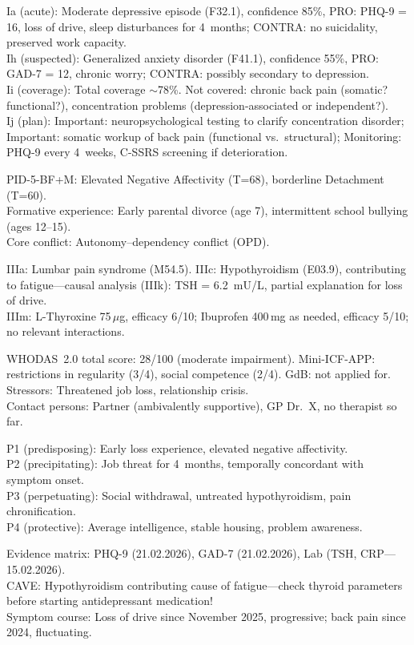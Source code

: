 \documentclass[11pt,a4paper]{article}
\begin{document}
\begin{description}[style=nextline, leftmargin=1.5cm, font=\bfseries\small]
\item[Axis~I (Mental Health Profiles)]
Ia (acute): Moderate depressive episode (F32.1), confidence 85\%, PRO: PHQ-9 = 16, loss of drive, sleep disturbances for 4~months; CONTRA: no suicidality, preserved work capacity. \\
Ih (suspected): Generalized anxiety disorder (F41.1), confidence 55\%, PRO: GAD-7 = 12, chronic worry; CONTRA: possibly secondary to depression. \\
Ii (coverage): Total coverage $\sim$78\%. Not covered: chronic back pain (somatic? functional?), concentration problems (depression-associated or independent?). \\
Ij (plan): Important: neuropsychological testing to clarify concentration disorder; Important: somatic workup of back pain (functional vs.\ structural); Monitoring: PHQ-9 every 4~weeks, C-SSRS screening if deterioration.
\item[Axis~II (Biography)]
PID-5-BF+M: Elevated Negative Affectivity (T=68), borderline Detachment (T=60). \\
Formative experience: Early parental divorce (age 7), intermittent school bullying (ages 12--15). \\
Core conflict: Autonomy--dependency conflict (OPD).
\item[Axis~III (Medical Synopsis)]
IIIa: Lumbar pain syndrome (M54.5). IIIc: Hypothyroidism (E03.9), contributing to fatigue---causal analysis (IIIk): TSH = 6.2~mU/L, partial explanation for loss of drive. \\
IIIm: L-Thyroxine 75\,$\mu$g, efficacy 6/10; Ibuprofen 400\,mg as needed, efficacy 5/10; no relevant interactions.
\item[Axis~IV (Environment \& Functioning)]
WHODAS~2.0 total score: 28/100 (moderate impairment). Mini-ICF-APP: restrictions in regularity (3/4), social competence (2/4). GdB: not applied for. \\
Stressors: Threatened job loss, relationship crisis. \\
Contact persons: Partner (ambivalently supportive), GP Dr.~X, no therapist so far.
\item[Axis~V (Condition Model)]
P1 (predisposing): Early loss experience, elevated negative affectivity. \\
P2 (precipitating): Job threat for 4~months, temporally concordant with symptom onset. \\
P3 (perpetuating): Social withdrawal, untreated hypothyroidism, pain chronification. \\
P4 (protective): Average intelligence, stable housing, problem awareness.
\item[Axis~VI (Evidence Collection)]
Evidence matrix: PHQ-9 (21.02.2026), GAD-7 (21.02.2026), Lab (TSH, CRP---15.02.2026). \\
CAVE: Hypothyroidism contributing cause of fatigue---check thyroid parameters before starting antidepressant medication! \\
Symptom course: Loss of drive since November 2025, progressive; back pain since 2024, fluctuating.
\end{description}
\end{document}
